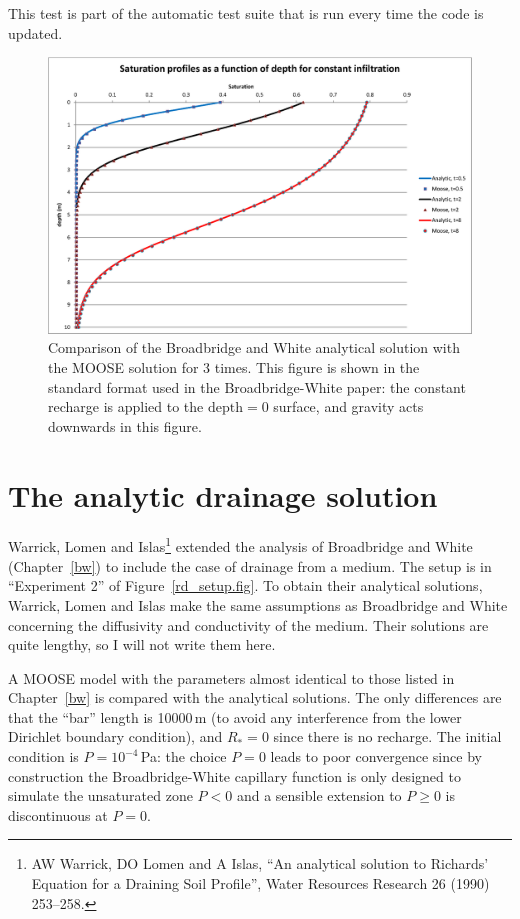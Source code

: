 \documentclass[]{scrreprt}
\begin{document}
This test is part of the automatic test suite that is run every time
the code is updated.

\begin{figure}[htb]
\centering
\includegraphics[width=16cm]{bw.eps}
\caption{Comparison of the Broadbridge and White analytical solution
  with the MOOSE solution for 3 times.  This figure is shown in the
  standard format used in the Broadbridge-White paper: the constant
  recharge is applied to the $\mbox{depth}=0$ surface, and gravity
  acts downwards in this figure.}
\label{bw.fig}
\end{figure}





\chapter{The analytic drainage solution}
\label{wli}

Warrick, Lomen and Islas\footnote{AW Warrick, DO Lomen and A Islas,
  ``An analytical solution to Richards' Equation for a Draining Soil
  Profile'', Water Resources Research 26 (1990) 253--258.} extended
the analysis of Broadbridge and White (Chapter~\ref{bw}) to include
the case of drainage from a medium.  The setup is in ``Experiment 2'' of
Figure~\ref{rd_setup.fig}.  To obtain their analytical
solutions, Warrick, Lomen and Islas make the same assumptions as
Broadbridge and White concerning the diffusivity and conductivity of
the medium.  Their solutions are quite lengthy, so I will not write
them here.

A MOOSE model with the parameters almost identical to those listed in
Chapter~\ref{bw} is compared with the analytical solutions.  The only
differences are that the ``bar'' length is 10000\,m (to avoid any
interference from the lower Dirichlet boundary condition), and
$R_{\ast}=0$ since there is no recharge.  The initial condition is
$P=10^{-4}$\,Pa: the choice $P=0$ leads to poor convergence since
by construction the Broadbridge-White capillary function is only
designed to simulate the unsaturated zone $P<0$ and a sensible
extension to $P\geq 0$ is discontinuous at $P=0$.
\end{document}
